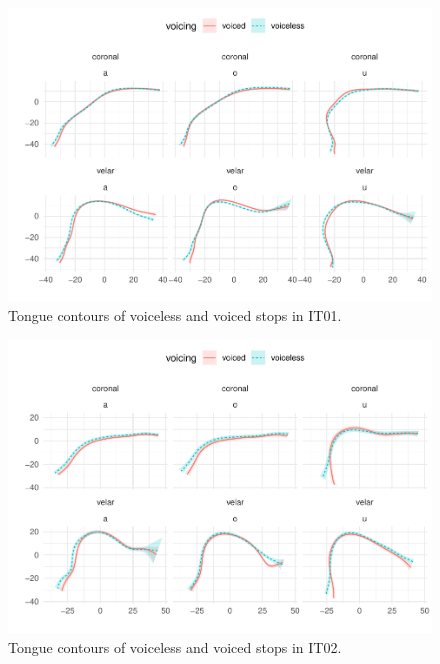 \documentclass[11pt,]{article}
\begin{document}
\begin{figure}

{\centering \includegraphics[width=.8\textwidth]{2018-polar-gam_files/figure-latex/Figure07} 

}

\caption{Tongue contours of voiceless and voiced stops in IT01.}\label{f:Figure07}
\end{figure}

\begin{figure}

{\centering \includegraphics[width=.8\textwidth]{2018-polar-gam_files/figure-latex/Figure08} 

}

\caption{Tongue contours of voiceless and voiced stops in IT02.}\label{f:Figure08}
\end{figure}
\end{document}
